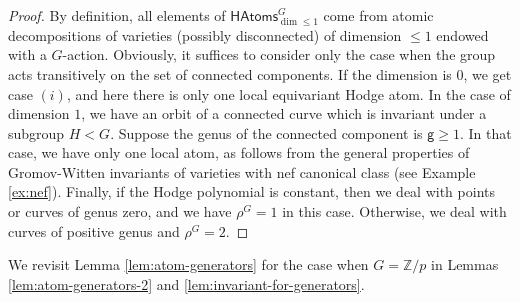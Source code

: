 \documentclass[12pt,a4paper]{amsart}
\theoremstyle{definition}
\theoremstyle{remark}
\newcommand{\rH}{\mathrm{H}}
\begin{document}
\begin{proof} By definition, all elements of  \(\mathsf{HAtoms}^{G}_{\dim \leq 1}\) come from atomic decompositions of varieties (possibly disconnected) of dimension $\le 1$ endowed with a $G$-action. Obviously, it suffices to consider only the case when the group acts transitively on the set of connected components. If the dimension is $0$, we get case $(i)$, and here there is only one local equivariant Hodge atom. In the case of dimension $1$, we have an orbit of a connected curve which is invariant under a subgroup $H<G$.
 Suppose the genus of the connected component is $\mathsf g\ge 1$. In that case, we have only one local atom, as follows from the general properties of Gromov-Witten invariants of varieties with nef canonical class (see Example \ref{ex:nef}). Finally, if the Hodge polynomial is constant, then we deal with points or curves of genus zero, and we have $\rho^G=1$ in this case. Otherwise, we deal with curves of positive genus and $\rho^G=2$.
\end{proof}

We revisit Lemma \ref{lem:atom-generators} for the case when $G=\mathbb Z/p$ in Lemmas \ref{lem:atom-generators-2} and \ref{lem:invariant-for-generators}.


\end{document}
